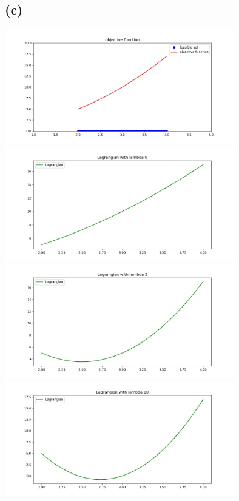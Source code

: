 \documentclass[12pt, a4 paper]{article}
\begin{document}
\begin{framed}
    \subsection{(c)}
    {\centering
    \includegraphics[width=10cm, height=5cm]{7c.jpg}
    }
    {\centering
    \includegraphics[width=10cm, height=5cm]{7c-lam0.jpg}
    }
    {\centering
    \includegraphics[width=10cm, height=5cm]{7c-lam5.jpg}
    }
    {\centering
    \includegraphics[width=10cm, height=5cm]{7c-lam10.jpg}
    }


\end{framed}
\end{document}
